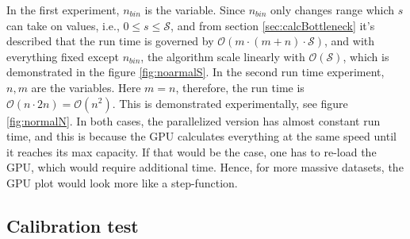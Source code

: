 \documentclass[a4paper]{article}
\begin{document}
\FloatBarrier
In the first experiment, $n_{bin}$ is the variable. Since $n_{bin}$ only changes range which $s$ can take on values, i.e., $0 \leq s \leq \mathcal{S}$, and from section \ref{sec:calcBottleneck} it's described that the run time is governed by $\mathcal{O}(m\cdot (m+n)\cdot \mathcal{S})$, and with everything fixed except $n_{bin}$, the algorithm scale linearly with $\mathcal{O}(\mathcal{S})$, which is demonstrated in the figure \ref{fig:noarmalS}.
In the second run time experiment, $n,m$ are the variables. Here $m=n$, therefore, the run time is $\mathcal{O}(n \cdot 2n)=\mathcal{O}(n^{2})$. This is demonstrated experimentally, see figure \ref{fig:normalN}.
In both cases, the parallelized version has almost constant run time, and this is because the GPU calculates everything at the same speed until it reaches its max capacity. If that would be the case, one has to re-load the GPU, which would require additional time. Hence, for more massive datasets, the GPU plot would look more like a step-function. 
\subsection{Calibration test}
\end{document}
